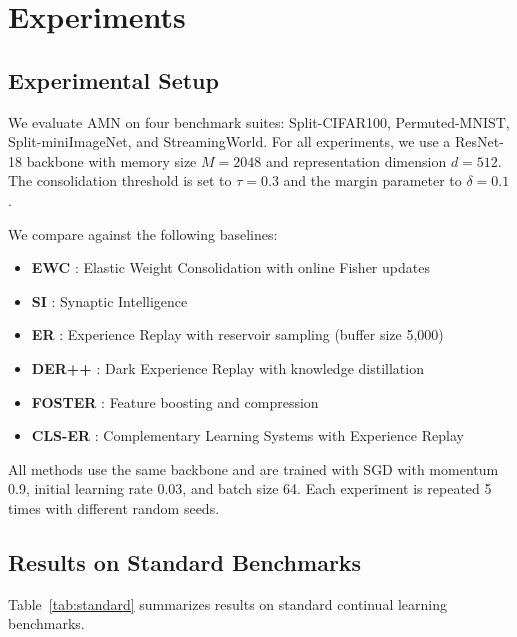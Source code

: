 \documentclass[11pt]{article}
\begin{document}
\section{Experiments}
\label{sec:experiments}

\subsection{Experimental Setup}

We evaluate AMN on four benchmark suites: Split-CIFAR100, Permuted-MNIST, Split-miniImageNet, and StreamingWorld. For all experiments, we use a ResNet-18 backbone with memory size $M = 2048$ and representation dimension $d = 512$. The consolidation threshold is set to $\tau = 0.3$ and the margin parameter to $\delta = 0.1$.

We compare against the following baselines:
\begin{itemize}
    \item \textbf{EWC} \citep{kirkpatrick2017overcoming}: Elastic Weight Consolidation with online Fisher updates
    \item \textbf{SI} \citep{zenke2017continual}: Synaptic Intelligence
    \item \textbf{ER} \citep{rolnick2019experience}: Experience Replay with reservoir sampling (buffer size 5,000)
    \item \textbf{DER++} \citep{buzzega2020dark}: Dark Experience Replay with knowledge distillation
    \item \textbf{FOSTER} \citep{wang2022foster}: Feature boosting and compression
    \item \textbf{CLS-ER} \citep{arani2022learning}: Complementary Learning Systems with Experience Replay
\end{itemize}

All methods use the same backbone and are trained with SGD with momentum 0.9, initial learning rate 0.03, and batch size 64. Each experiment is repeated 5 times with different random seeds.

\subsection{Results on Standard Benchmarks}

Table~\ref{tab:standard} summarizes results on standard continual learning benchmarks.
\end{document}
